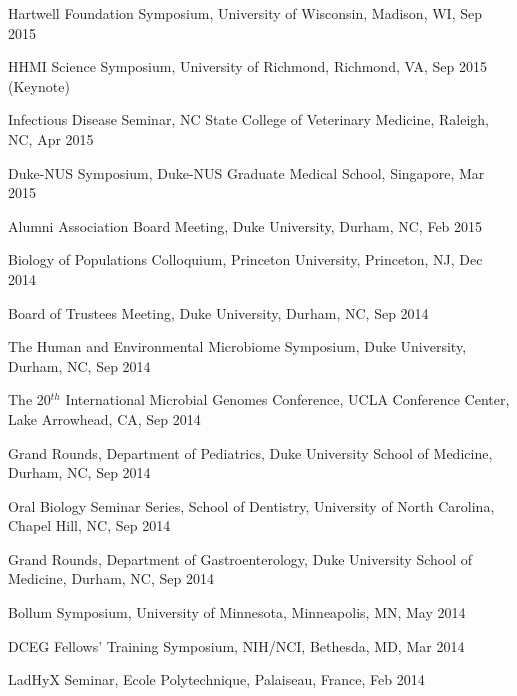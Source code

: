 \documentclass[overlapped,line,11pt]{res}
\begin{document}
\begin{resume}
\begin{revnumerate}[50]
\item {Hartwell Foundation Symposium, University of Wisconsin, Madison, WI, Sep 2015}

\item {HHMI Science Symposium, University of Richmond, Richmond, VA, Sep 2015 (Keynote)}

\item {Infectious Disease Seminar, NC State College of Veterinary Medicine, Raleigh, NC, Apr 2015}

\item {Duke-NUS Symposium, Duke-NUS Graduate Medical School, Singapore, Mar 2015}

\item {Alumni Association Board Meeting, Duke University,
  Durham, NC, Feb 2015
  }

\item {Biology of Populations Colloquium, Princeton University, Princeton, NJ, Dec 2014
  }

\item {Board of Trustees Meeting, Duke University,
  Durham, NC, Sep 2014
  }

\item { The Human and Environmental Microbiome Symposium, Duke University,
  Durham, NC, Sep 2014
  }

\item {The 20$^{th}$ International Microbial Genomes Conference, UCLA
  Conference Center, Lake Arrowhead, CA, Sep 2014
  }

\item {Grand Rounds, Department of Pediatrics, Duke University School of
  Medicine, Durham, NC, Sep 2014
  }

\item {Oral Biology Seminar Series, School of Dentistry, University of
  North Carolina, Chapel Hill, NC, Sep 2014
  }

\item {Grand Rounds, Department of Gastroenterology, Duke University School of
  Medicine, Durham, NC, Sep 2014
  }

\item {Bollum Symposium, University of Minnesota, Minneapolis, MN, May 2014
  }

\item {DCEG Fellows’ Training Symposium, NIH/NCI, Bethesda, MD, Mar 2014
  }

\item {LadHyX Seminar, Ecole
  Polytechnique, Palaiseau, France, Feb 2014}


\end{revnumerate}
\end{resume}
\end{document}
